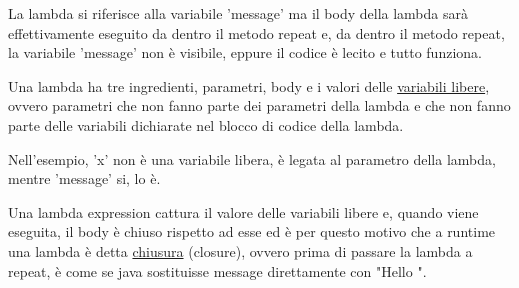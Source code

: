 La lambda si riferisce alla variabile 'message' ma il body della lambda sarà effettivamente eseguito da dentro il metodo repeat e, da dentro il metodo repeat, la 
variabile 'message' non è visibile, eppure il codice è lecito e tutto funziona.

Una lambda ha tre ingredienti, parametri, body e i valori delle \underline{variabili libere}, ovvero parametri che non fanno parte dei parametri della lambda e che non
fanno parte delle variabili dichiarate nel blocco di codice della lambda.

Nell'esempio, 'x' non è una variabile libera, è legata al parametro della lambda, mentre 'message' si, lo è.

Una lambda expression cattura il valore delle variabili libere e, quando viene eseguita, il body è chiuso rispetto ad esse ed è per questo motivo che a runtime una
lambda è detta \underline{chiusura} (closure), ovvero prima di passare la lambda a repeat, è come se java sostituisse message direttamente con "Hello ".









